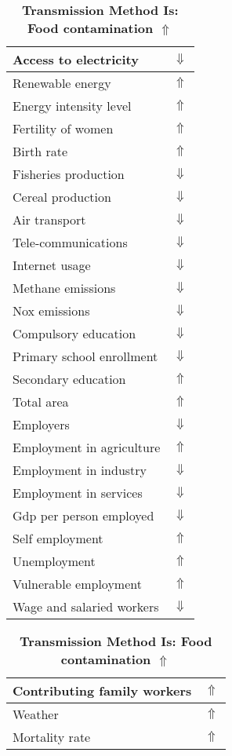 \documentclass[12pt,notitlepage,oneside]{report}
\begin{document}
\begin{table}[!htb]
\caption{\textbf{Transmission Method Is: Food contamination $\Uparrow$}}
\centering
\label{Correlated Socio-economic Factors0}
\begin{tabular}{|l|l|}
\hline
Access to electricity & $\Downarrow$\\ \hline
Renewable energy & $\Uparrow$\\ \hline
Energy intensity level & $\Uparrow$\\ \hline
Fertility of women & $\Uparrow$\\ \hline
Birth rate & $\Uparrow$\\ \hline
Fisheries production & $\Downarrow$\\ \hline
Cereal production & $\Downarrow$\\ \hline
Air transport  & $\Downarrow$\\ \hline
Tele-communications & $\Downarrow$\\ \hline
Internet usage & $\Downarrow$\\ \hline
Methane emissions & $\Downarrow$\\ \hline
Nox emissions & $\Downarrow$\\ \hline
Compulsory education & $\Downarrow$\\ \hline
Primary school enrollment & $\Downarrow$\\ \hline
Secondary education & $\Uparrow$\\ \hline
Total area & $\Uparrow$\\ \hline
Employers & $\Downarrow$\\ \hline
Employment in agriculture & $\Uparrow$\\ \hline
Employment in industry & $\Downarrow$\\ \hline
Employment in services & $\Downarrow$\\ \hline
Gdp per person employed & $\Downarrow$\\ \hline
Self employment & $\Uparrow$\\ \hline
Unemployment & $\Uparrow$\\ \hline
Vulnerable employment & $\Uparrow$\\ \hline
Wage and salaried workers & $\Downarrow$\\ \hline
\end{tabular}
\begin{tabular}{|l|l|}
\hline
Contributing family workers & $\Uparrow$\\ \hline
Weather & $\Uparrow$\\ \hline
Mortality rate & $\Uparrow$\\ \hline

\end{tabular}
\end{table}
\end{document}
